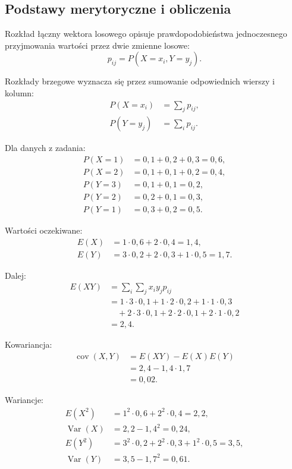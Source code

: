 \documentclass[12pt,a4paper]{article}
\begin{document}
\subsection{Podstawy merytoryczne i obliczenia}

Rozkład łączny wektora losowego opisuje prawdopodobieństwa jednoczesnego przyjmowania wartości przez dwie zmienne losowe:
\begin{equation}
  p_{ij} = P(X=x_i,Y=y_j).
\end{equation}

Rozkłady brzegowe wyznacza się przez sumowanie odpowiednich wierszy i kolumn:
\begin{align}
  P(X=x_i) &= \sum_j p_{ij},\\
  P(Y=y_j) &= \sum_i p_{ij}.
\end{align}

Dla danych z zadania:
\begin{align}
  P(X=1) &= 0{,}1 + 0{,}2 + 0{,}3 = 0{,}6,\\
  P(X=2) &= 0{,}1 + 0{,}1 + 0{,}2 = 0{,}4,\\
  P(Y=3) &= 0{,}1 + 0{,}1 = 0{,}2,\\
  P(Y=2) &= 0{,}2 + 0{,}1 = 0{,}3,\\
  P(Y=1) &= 0{,}3 + 0{,}2 = 0{,}5.
\end{align}

Wartości oczekiwane:
\begin{align}
  E(X) &= 1 \cdot 0{,}6 + 2 \cdot 0{,}4 = 1{,}4,\\
  E(Y) &= 3 \cdot 0{,}2 + 2 \cdot 0{,}3 + 1 \cdot 0{,}5 = 1{,}7.
\end{align}

Dalej:
\begin{align}
E(XY) &= \sum_i \sum_j x_i y_j p_{ij}\\
&= 1 \cdot 3 \cdot 0{,}1 + 1 \cdot 2 \cdot 0{,}2 + 1 \cdot 1 \cdot 0{,}3\\
&\quad + 2 \cdot 3 \cdot 0{,}1 + 2 \cdot 2 \cdot 0{,}1 + 2 \cdot 1 \cdot 0{,}2\\
&= 2{,}4.
\end{align}

Kowariancja:
\begin{align}
  \operatorname{cov}(X,Y) &= E(XY) - E(X)E(Y)\\
  &= 2{,}4 - 1{,}4 \cdot 1{,}7\\
  &= 0{,}02.
\end{align}

Wariancje:
\begin{align}
  E(X^2) &= 1^2 \cdot 0{,}6 + 2^2 \cdot 0{,}4 = 2{,}2,\\
  \operatorname{Var}(X) &= 2{,}2 - 1{,}4^2 = 0{,}24,\\
  E(Y^2) &= 3^2 \cdot 0{,}2 + 2^2 \cdot 0{,}3 + 1^2 \cdot 0{,}5 = 3{,}5,\\
  \operatorname{Var}(Y) &= 3{,}5 - 1{,}7^2 = 0{,}61.
\end{align}
\end{document}
